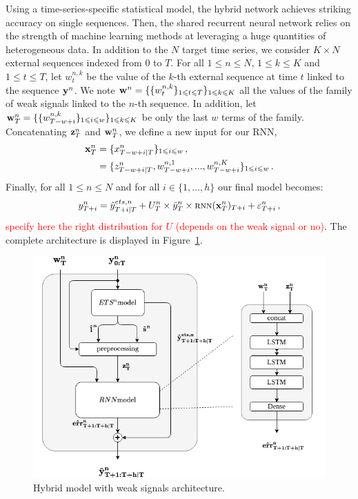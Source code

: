 \documentclass[letterpaper]{article} %
\newcommand{\ts}{y}
\newcommand{\fullts}{{\bf \ts}}
\newcommand{\tspred}{\hat{\ts}}
\newcommand{\lag}{h}
\newcommand{\window}{w}
\newcommand{\etspred}{\hat{y}}
\newcommand{\meants}{\Bar{\ts}}
\newcommand{\rnnwindow}{{\bf \rnn}}
\newcommand{\rnn}{z}
\newcommand{\rnnmodel}{\textsc{rnn}}
\newcommand{\ws}{w}
\newcommand{\fullws}{{\bf \ws}}
\newcommand{\concatinput}{x}
\newcommand{\fullconcatinput}{{ \bf \concatinput}}
\begin{document}
Using a time-series-specific statistical model, the hybrid network achieves striking accuracy on single sequences. Then, the shared recurrent neural network relies on the strength of machine learning methods at leveraging a huge quantities of heterogeneous data.
In addition to the $N$ target time series, we consider $K \times N$ external sequences indexed from $0$ to $T$. For all $1\leqslant n \leqslant N$, $1\leqslant k \leqslant K$ and  $1\leqslant t \leqslant T$, let $\ws^{n,k}_t$ be the value of the $k$-th external sequence at time $t$ linked to the sequence $\fullts^n$. We note $\fullws^n = \{\{\ws_t^{n,k}\}_{1\leqslant t \leqslant T}\}_{1\leqslant k \leqslant K}$ all the values of the family of weak signals linked to the $n$-th sequence. In addition, let $\fullws^n_T = \{\{\ws_{T-w+i}^{n,k}\}_{1\leqslant i \leqslant \window}\}_{1\leqslant k \leqslant K}$ be only the last $\window$ terms of the family. Concatenating $ \rnnwindow^n_T$ and $\fullws^n_T$, we define a new input for our RNN,   
\begin{align*}
\fullconcatinput^n_T &= \{\concatinput^n_{T-w+i|T}\}_{1\leqslant i \leqslant w}\,, \\
&= \{\rnn^n_{T-w+i|T}, \ws^{n,1}_{T-w+i},...,\ws^{n,K}_{T-w+i}\}_{1\leqslant i \leqslant w}\,.
\end{align*}
Finally, for all $1\leqslant n \leqslant N$ and for all $i \in \{1,\ldots,\lag\}$ our final model becomes:
\begin{equation}
\label{eq:full:model}
\ts^n_{T+i}  = \etspred^{ets,n}_{T+i|T} +  U^n_T\times\meants^n_T\times \rnnmodel(\fullconcatinput^n_T)_{T+i} + \varepsilon^n_{T+i}\,,
\end{equation}
\textcolor{red}{specify here the right distribution for $U$ (depends on the weak signal or no)}. The complete architecture is displayed in Figure~\ref{fig:architecture}.

\begin{figure}
  \centering
    \includegraphics[width=0.8\linewidth]{figure/hybrid_model_archi.png}
  \caption{Hybrid model with weak signals architecture.}
\label{fig:architecture}
\end{figure}
\end{document}
